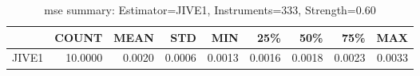 \begin{table}[ht]
\centering
\caption{mse summary: Estimator=JIVE1, Instruments=333, Strength=0.60}
\begin{tabular}{lrrrrrrrr}
\toprule
 & COUNT & MEAN & STD & MIN & 25\% & 50\% & 75\% & MAX \\
\midrule
JIVE1 & 10.0000 & 0.0020 & 0.0006 & 0.0013 & 0.0016 & 0.0018 & 0.0023 & 0.0033 \\
\bottomrule
\end{tabular}
\end{table}
